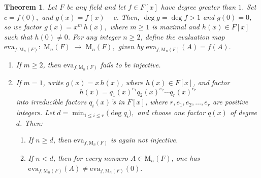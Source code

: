 \documentclass{amsart}
\newtheorem{theorem}{Theorem}[section]
\theoremstyle{definition}
\begin{document}
	
	
	\begin{theorem}\label{matrix}
		Let $F$ be any field and let $f\in F[x]$ have degree greater than $1$.  Set $c = f(0),$ and	$g(x) = f(x) - c.$
		Then, $\deg g = \deg f > 1$ and $g(0)=0$, so we factor $g(x) = x^m\,h(x),$
		where $m\ge1$ is maximal and $h(x)\in F[x]$ such that $h(0)\neq0$.  For any integer $n\geq2$, define the evaluation map
		$\mathrm{eva}_{f,\mathrm{M}_n(F)}:\;\mathrm{M}_n(F)\;\longrightarrow\;\mathrm{M}_n(F),$ given by
		$\mathrm{eva}_{f,\mathrm{M}_n(F)}(A)=f(A).$
		\begin{enumerate}[{\upshape(i)}]
			\item If $m\ge2$, then $\mathrm{eva}_{f,\mathrm{M}_n(F)}$ fails to be injective.
			\item If $m=1$, write $g(x)=x\,h(x)$, where $h(x)\in F[x]$, and factor
			\[
			h(x)=q_1(x)^{e_1}q_2(x)^{e_2}\cdots q_r(x)^{e_r}
			\]
			into irreducible factors $q_i(x)$'s in $F[x]$, where $r,e_1,e_2,\ldots,e_r$ are positive integers.  Let
			$\displaystyle d = \min_{1\le i\le r}\bigl(\deg q_i\bigr),$
			and choose one factor $q(x)$ of degree $d$.  Then:
			\begin{enumerate}[{\upshape(a)}]
				\item If $n\ge d$, then $\mathrm{eva}_{f,\mathrm{M}_n(F)}$ is again not injective.
				\item If $n<d$, then for every nonzero $A\in \mathrm{M}_n(F)$, one has
				$\mathrm{eva}_{f,\mathrm{M}_n(F)}(A)\neq\mathrm{eva}_{f,\mathrm{M}_n(F)}(0).$
			\end{enumerate}
		\end{enumerate}
	\end{theorem}
	
\end{document}
